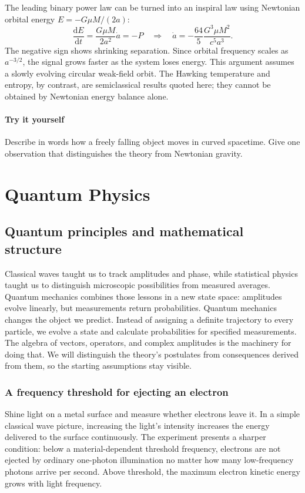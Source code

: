 \documentclass[11pt,oneside]{book}
\newcommand{\dd}{\mathrm{d}}
\newcommand{\od}[2]{\frac{\dd #1}{\dd #2}}
\theoremstyle{reviewstyle}
\newcommand{\learningcheck}[1]{\subsection*{Try it yourself}\noindent #1\par}
\begin{document}
The leading binary power law can be turned into an inspiral law using Newtonian orbital energy $E=-G\mu M/(2a)$:
\begin{equation}
\od Et=\frac{G\mu M}{2a^2}\dot a=-P
\quad\Longrightarrow\quad
\dot a=-\frac{64}{5}\frac{G^3\mu M^2}{c^5a^3}.
\end{equation}
The negative sign shows shrinking separation. Since orbital frequency scales as $a^{-3/2}$, the signal grows faster as the system loses energy. This argument assumes a slowly evolving circular weak-field orbit. The Hawking temperature and entropy, by contrast, are semiclassical results quoted here; they cannot be obtained by Newtonian energy balance alone.

\learningcheck{Describe in words how a freely falling object moves in curved spacetime. Give one observation that distinguishes the theory from Newtonian gravity.}

\part{Quantum Physics}
\chapter{Quantum principles and mathematical structure}
Classical waves taught us to track amplitudes and phase, while statistical physics taught us to distinguish microscopic possibilities from measured averages. Quantum mechanics combines those lessons in a new state space: amplitudes evolve linearly, but measurements return probabilities.
Quantum mechanics changes the object we predict. Instead of assigning a definite trajectory to every particle, we evolve a state and calculate probabilities for specified measurements. The algebra of vectors, operators, and complex amplitudes is the machinery for doing that. We will distinguish the theory's postulates from consequences derived from them, so the starting assumptions stay visible.

\section{A frequency threshold for ejecting an electron}
Shine light on a metal surface and measure whether electrons leave it. In a simple classical wave picture, increasing the light's intensity increases the energy delivered to the surface continuously. The experiment presents a sharper condition: below a material-dependent threshold frequency, electrons are not ejected by ordinary one-photon illumination no matter how many low-frequency photons arrive per second. Above threshold, the maximum electron kinetic energy grows with light frequency.
\end{document}
